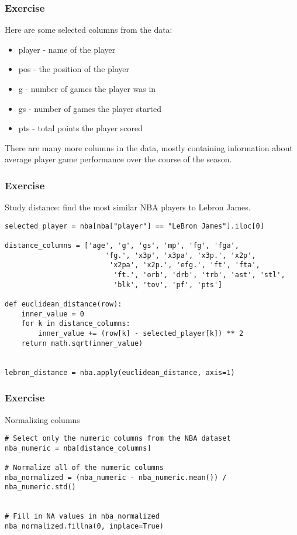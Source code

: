 \begin{frame}[fragile]\frametitle{Exercise}
Here are some selected columns from the data:
\begin{itemize}
\item     player - name of the player
\item     pos - the position of the player
\item     g - number of games the player was in
\item     gs - number of games the player started
\item     pts - total points the player scored
\end{itemize}
There are many more columns in the data, mostly containing information about average player game performance over the course of the season.
\end{frame}

\begin{frame}[fragile]\frametitle{Exercise}
Study distance: find the most similar NBA players to Lebron James.
\begin{lstlisting}
selected_player = nba[nba["player"] == "LeBron James"].iloc[0]

distance_columns = ['age', 'g', 'gs', 'mp', 'fg', 'fga', 
						'fg.', 'x3p', 'x3pa', 'x3p.', 'x2p',
						 'x2pa', 'x2p.', 'efg.', 'ft', 'fta',
						  'ft.', 'orb', 'drb', 'trb', 'ast', 'stl', 
						  'blk', 'tov', 'pf', 'pts']

def euclidean_distance(row):
    inner_value = 0
    for k in distance_columns:
        inner_value += (row[k] - selected_player[k]) ** 2
    return math.sqrt(inner_value)


lebron_distance = nba.apply(euclidean_distance, axis=1)
\end{lstlisting}
\end{frame}

\begin{frame}[fragile]\frametitle{Exercise}
Normalizing columns
\begin{lstlisting}
# Select only the numeric columns from the NBA dataset
nba_numeric = nba[distance_columns]

# Normalize all of the numeric columns
nba_normalized = (nba_numeric - nba_numeric.mean()) / nba_numeric.std()


# Fill in NA values in nba_normalized
nba_normalized.fillna(0, inplace=True)
\end{lstlisting}
\end{frame}

